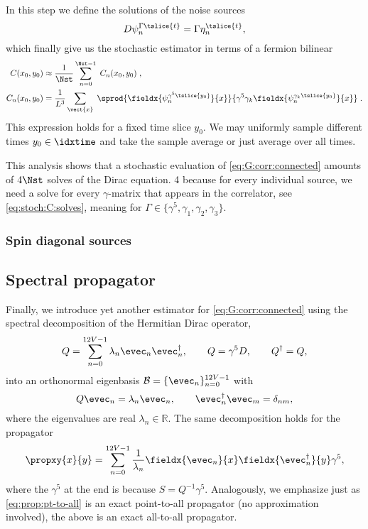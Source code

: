 In this step we define the solutions of the noise sources
\begin{equation} \label{eq:stoch:C:solves}
D \psi_{n}^{\Gamma \tslice{t}} = \Gamma \eta_n^{\tslice{t}},
\end{equation}
which finally give us the stochastic estimator in terms of a fermion bilinear
\begin{align} \label{eq:stoch:C:full:final}
C(x_0, y_0)
&\approx \frac{1}{\Nst} \sum_{n=0}^{\Nst-1} \; C_n(x_0, y_0) \;, \\
C_n(x_0, y_0)
&= \frac{1}{L^{3}} \sum_{\vect{x}} \;
\sprod{
  \fieldx{\psi_{n}^{\gamma^{5} \tslice{y_0}}}{x}
}{
  \gamma^{5}
  \gamma_k
  \fieldx{\psi_{n}^{\gamma_k \tslice{y_0}}}{x}
} \;.
\end{align}
This expression holds for a fixed time slice $y_0$.
We may uniformly sample different times $y_0 \in \idxtime$ and take the sample average or just average over all times.

This analysis shows that a stochastic evaluation of \cref{eq:G:corr:connected} amounts of $4 \Nst$ solves of the Dirac equation. \num{4} because for every individual source, we need a solve for every $\gamma$-matrix that appears in the correlator, see \cref{eq:stoch:C:solves}, meaning for $\Gamma \in \{ \gamma^{5}, \gamma_1, \gamma_2, \gamma_3 \}$.

\subsubsection{Spin diagonal sources}


\subsection{Spectral propagator}

Finally, we introduce yet another estimator for \cref{eq:G:corr:connected} using the spectral decomposition of the Hermitian Dirac operator,
\begin{equation}
Q = \sum_{n=0}^{12V-1} \lambda_{n} \evec_{n} \evec_{n}^{\dagger},
\qquad
Q = \gamma^{5} D,
\qquad
Q^{\dagger} = Q,
\end{equation}
into an orthonormal eigenbasis $\mathcal{B} = \{ \evec_n \}_{n=0}^{12V-1}$ with
\begin{equation}
Q \evec_{n} = \lambda_{n} \evec_{n},
\qquad
\evec_{n}^{\dagger} \evec_{m} = \delta_{nm},
\end{equation}
where the eigenvalues are real $\lambda_{n} \in \mathbb{R}$.
The same decomposition holds for the propagator
\begin{equation} \label{eq:prop:all-to-all}
\propxy{x}{y} = \sum_{n=0}^{12V-1} \frac{1}{\lambda_{n}} \fieldx{\evec_{n}}{x} \fieldx{\evec_{n}^{\dagger}}{y} \gamma^{5},
\end{equation}
where the $\gamma^{5}$ at the end is because $S = Q^{-1} \gamma^{5}$.
Analogously, we emphasize just as \cref{eq:prop:pt-to-all} is an exact point-to-all propagator (no approximation involved), the above is an exact all-to-all propagator.

